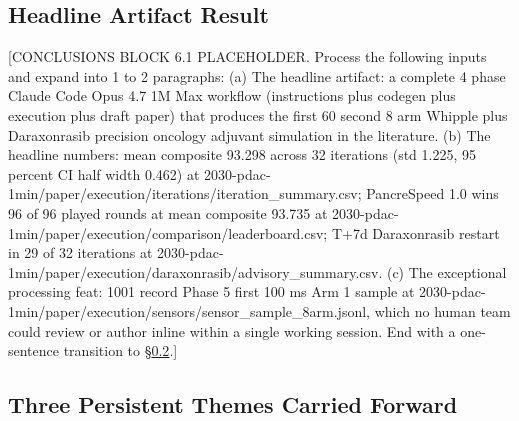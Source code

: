 %

\subsection{Headline Artifact Result}
\label{sec:conclusions-headline}

[CONCLUSIONS BLOCK 6.1 PLACEHOLDER. Process the following inputs and expand into 1 to 2 paragraphs:
(a) The headline artifact: a complete 4 phase Claude Code Opus 4.7 1M Max workflow (instructions plus codegen plus execution plus draft paper) that produces the first 60 second 8 arm Whipple plus Daraxonrasib precision oncology adjuvant simulation in the literature.
(b) The headline numbers: mean composite 93.298 across 32 iterations (std 1.225, 95 percent CI half width 0.462) at 2030-pdac-1min/paper/execution/iterations/iteration_summary.csv; PancreSpeed 1.0 wins 96 of 96 played rounds at mean composite 93.735 at 2030-pdac-1min/paper/execution/comparison/leaderboard.csv; T+7d Daraxonrasib restart in 29 of 32 iterations at 2030-pdac-1min/paper/execution/daraxonrasib/advisory_summary.csv.
(c) The exceptional processing feat: 1001 record Phase 5 first 100 ms Arm 1 sample at 2030-pdac-1min/paper/execution/sensors/sensor_sample_8arm.jsonl, which no human team could review or author inline within a single working session.
End with a one-sentence transition to \S \ref{sec:conclusions-themes}.]

\subsection{Three Persistent Themes Carried Forward}
\label{sec:conclusions-themes}

